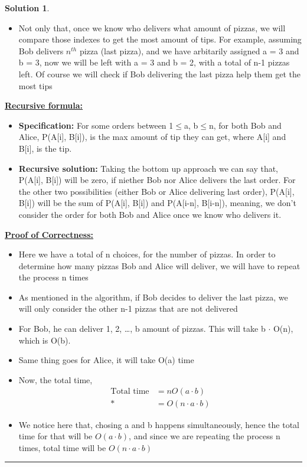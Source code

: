\documentclass{article}
\theoremstyle{definition}
\def\fline{\rule{0.75\linewidth}{0.5pt}}
\newcommand{\finishline}{\vspace{-15pt}\begin{center}\fline\end{center}}
\newtheorem*{solution*}{Solution}
\newenvironment{solution}{\begin{solution*}}{{\finishline} \end{solution*}}
\begin{document}
\begin{solution}
\begin{itemize}
		\item Not only that, once we know who delivers what amount of pizzas, we will compare those indexes to get the most amount of tips. For example, assuming Bob delivers $n^{th}$ pizza (last pizza), and we have arbitarily assigned a = 3 and b = 3, now we will be left with a = 3 and b = 2, with a total of n-1 pizzas left. Of course we will check if Bob delivering the last pizza help them get the most tips
	\end{itemize} 
	\textbf{\underline{Recursive formula:}}
	\begin{itemize} 
		\item{\textbf{Specification:}} For some orders between 1$\leq$a, b$\leq$n, for both Bob and Alice, P(A[i], B[i]), is the max amount of tip they can get, where A[i] and B[i], is the tip.
		\item{\textbf{Recursive solution:}} Taking the bottom up approach we can say that, P(A[i], B[i]) will be zero, if niether Bob nor Alice delivers the last order. For the other two possibilities (either Bob or Alice delivering last order), P(A[i], B[i]) will be the sum of P(A[i], B[i]) and P(A[i-n], B[i-n]), meaning, we don't consider the order for both Bob and Alice once we know who delivers it.
	\end{itemize} 
	\textbf{\underline{Proof of Correctness:}}
	\begin{itemize}
		\item Here we have a total of n choices, for the number of pizzas. In order to determine how many pizzas Bob and Alice will deliver, we will have to repeat the process n times
		\item As mentioned in the algorithm, if Bob decides to deliver the last pizza, we will only consider the other n-1 pizzas that are not delivered
		\item For Bob, he can deliver 1, 2, \dots, b amount of pizzas. This will take b $\cdot$ O(n), which is O(b).
		\item Same thing goes for Alice, it will take O(a) time
		\item Now, the total time, \\
			\begin{align*}
				{\text{Total time}} &= nO(a\cdot b)\\*
				 &= O(n\cdot a\cdot b)
			\end{align*}
		\item We notice here that, chosing a and b happens simultaneously, hence the total time for that will be $O(a\cdot b)$, and since we are repeating the process n times, total time will be $O(n\cdot a\cdot b)$

\end{itemize}
\end{solution}
\end{document}
